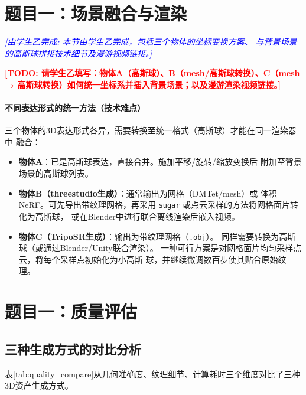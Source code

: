 \documentclass{article}
\newcommand{\placeholder}[1]{\textcolor{red}{\textbf{[TODO: #1]}}}
\newcommand{\tmate}[2]{\textcolor{blue}{\textit{[由#1完成: #2]}}}
\begin{document}
\section{题目一：场景融合与渲染}
\label{sec:fusion}

\tmate{学生乙}{本节由学生乙完成，包括三个物体的坐标变换方案、
与背景场景的高斯球拼接技术细节及漫游视频链接。}

\placeholder{请学生乙填写：物体A（高斯球）、B（mesh/高斯球转换）、C（mesh → 高斯球转换）如何统一坐标系并插入背景场景；以及漫游渲染视频链接。}

\paragraph{不同表达形式的统一方法（技术难点）}
三个物体的3D表达形式各异，需要转换至统一格式（高斯球）才能在同一渲染器中
融合：
\begin{itemize}
  \item \textbf{物体A}：已是高斯球表达，直接合并。施加平移/旋转/缩放变换后
        附加至背景场景的高斯球列表。
  \item \textbf{物体B（threestudio生成）}：通常输出为网格（DMTet/mesh）或
        体积NeRF。可先导出带纹理网格，再采用 \texttt{sugar}
        \cite{guedon2024sugar} 或点云采样的方法将网格面片转化为高斯球，
        或在Blender中进行联合离线渲染后嵌入视频。
  \item \textbf{物体C（TripoSR生成）}：输出为带纹理网格（\texttt{.obj}）。
        同样需要转换为高斯球（或通过Blender/Unity联合渲染）。
        一种可行方案是对网格面片均匀采样点云，将每个采样点初始化为小高斯
        球，并继续微调数百步使其贴合原始纹理。
\end{itemize}

\section{题目一：质量评估}
\label{sec:quality}

\subsection{三种生成方式的对比分析}

表\ref{tab:quality_compare}从几何准确度、纹理细节、计算耗时三个维度对比了三种
3D资产生成方式。
\end{document}
